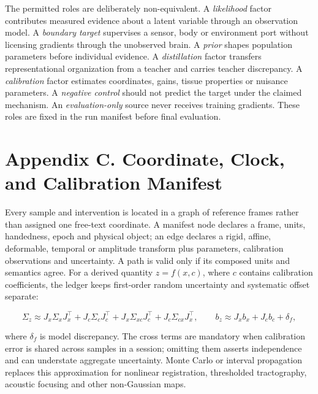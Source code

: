The permitted roles are deliberately non-equivalent. A \emph{likelihood}
factor contributes measured evidence about a latent variable through an
observation model. A \emph{boundary target} supervises a sensor, body or
environment port without licensing gradients through the unobserved brain.
A \emph{prior} shapes population parameters before individual evidence. A
\emph{distillation} factor transfers representational organization from a
teacher and carries teacher discrepancy. A \emph{calibration} factor estimates
coordinates, gains, tissue properties or nuisance parameters. A
\emph{negative control} should not predict the target under the claimed
mechanism. An \emph{evaluation-only} source never receives training gradients.
These roles are fixed in the run manifest before final evaluation.

\clearpage
\section{Appendix C. Coordinate, Clock, and Calibration Manifest}

Every sample and intervention is located in a graph of reference frames rather
than assigned one free-text coordinate. A manifest node declares a frame,
units, handedness, epoch and physical object; an edge declares a rigid,
affine, deformable, temporal or amplitude transform plus parameters,
calibration observations and uncertainty. A path is valid only if its
composed units and semantics agree. For a derived quantity \(z=f(x,c)\), where
\(c\) contains calibration coefficients, the ledger keeps first-order random
uncertainty and systematic offset separate:

\[
\Sigma_z \approx J_x\Sigma_xJ_x^\top+J_c\Sigma_cJ_c^\top
+J_x\Sigma_{xc}J_c^\top+J_c\Sigma_{cx}J_x^\top,
\qquad
b_z \approx J_xb_x+J_cb_c+\delta_f ,
\]

where \(\delta_f\) is model discrepancy. The cross terms are mandatory when
calibration error is shared across samples in a session; omitting them asserts
independence and can understate aggregate uncertainty. Monte Carlo or interval propagation
replaces this approximation for nonlinear registration, thresholded
tractography, acoustic focusing and other non-Gaussian maps.


